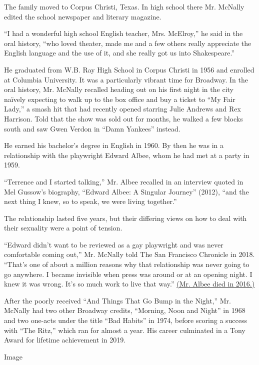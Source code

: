 The family moved to Corpus Christi, Texas. In high school there Mr.
McNally edited the school newspaper and literary magazine.

``I had a wonderful high school English teacher, Mrs. McElroy,'' he said
in the oral history, ``who loved theater, made me and a few others
really appreciate the English language and the use of it, and she really
got us into Shakespeare.''

He graduated from W.B. Ray High School in Corpus Christi in 1956 and
enrolled at Columbia University. It was a particularly vibrant time for
Broadway. In the oral history, Mr. McNally recalled heading out on his
first night in the city naïvely expecting to walk up to the box office
and buy a ticket to ``My Fair Lady,'' a smash hit that had recently
opened starring Julie Andrews and Rex Harrison. Told that the show was
sold out for months, he walked a few blocks south and saw Gwen Verdon in
``Damn Yankees'' instead.

He earned his bachelor's degree in English in 1960. By then he was in a
relationship with the playwright Edward Albee, whom he had met at a
party in 1959.

``Terrence and I started talking,'' Mr. Albee recalled in an interview
quoted in Mel Gussow's biography, ``Edward Albee: A Singular Journey''
(2012), ``and the next thing I knew, so to speak, we were living
together.''

The relationship lasted five years, but their differing views on how to
deal with their sexuality were a point of tension.

``Edward didn't want to be reviewed as a gay playwright and was never
comfortable coming out,'' Mr. McNally told The San Francisco Chronicle
in 2018. ``That's one of about a million reasons why that relationship
was never going to go anywhere. I became invisible when press was around
or at an opening night. I knew it was wrong. It's so much work to live
that way.''
\href{https://www.nytimes.com/2016/09/17/arts/edward-albee-playwright-of-a-desperate-generation-dies-at-88.html}{(Mr.
Albee died in 2016.)}

After the poorly received ``And Things That Go Bump in the Night,'' Mr.
McNally had two other Broadway credits, ``Morning, Noon and Night'' in
1968 and two one-acts under the title ``Bad Habits'' in 1974, before
scoring a success with ``The Ritz,'' which ran for almost a year. His
career culminated in a Tony Award for lifetime achievement in 2019.

Image


